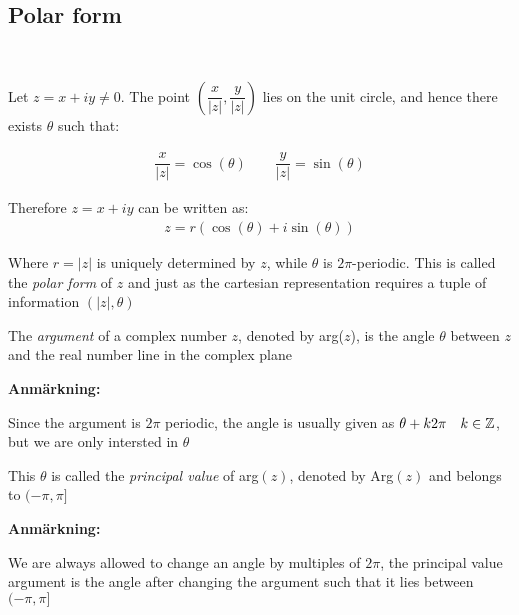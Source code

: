 \subsection{Polar form}\hfill\\\par
\noindent Let $z = x+iy\neq0$. The point $\left(\dfrac{x}{\left|z\right|}, \dfrac{y}{\left|z\right|}\right)$ lies on the unit circle, and hence there exists $\theta$ such that:
\par\bigskip
\begin{equation*}
  \begin{gathered}
    \dfrac{x}{\left|z\right|} = \cos(\theta)\qquad \dfrac{y}{\left|z\right|} = \sin(\theta)
  \end{gathered}
\end{equation*}
\par\bigskip
\noindent Therefore $z = x+iy$ can be written as:
\begin{equation*}
  \begin{gathered}
    z = r(\cos(\theta)+i\sin(\theta))
  \end{gathered}
\end{equation*}\par
\noindent Where $r = \left|z\right|$ is uniquely determined by $z$, while $\theta$ is $2\pi$-periodic.
\noindent This is called the \textit{polar form} of $z$ and just as the cartesian representation requires a tuple of information $(\left|z\right|,\theta)$
\par\bigskip
\begin{theo}[Argument]{}
  The \textit{argument} of a complex number $z$, denoted by arg($z$), is the angle $\theta$ between $z$ and the real number line in the complex plane
\end{theo}
\par\bigskip
\noindent\textbf{Anmärkning:}\par
\noindent Since the argument is $2\pi$ periodic, the angle is usually given as $\theta+k2\pi\quad k\in\mathbb{Z}$, but we are only intersted in $\theta$\par
\noindent This $\theta$ is called the \textit{principal value} of arg$(z)$, denoted by Arg$(z)$ and belongs to $(-\pi,\pi]$
\par\bigskip
\noindent\textbf{Anmärkning:}\par
\noindent We are always allowed to change an angle by multiples of $2\pi$, the principal value argument is the angle after changing the argument such that it lies between $(-\pi,\pi]$
\par\bigskip

